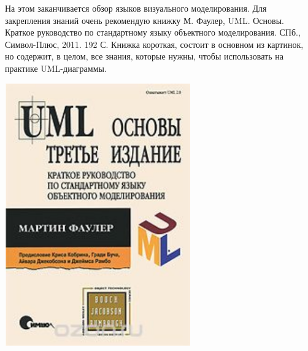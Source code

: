 \documentclass[a5paper]{article}
\newlength\Colsep
\begin{document}
\noindent\begin{minipage}{\textwidth}
	\begin{minipage}[c][6cm][c]{\dimexpr0.7\textwidth-0.5\Colsep\relax}
		На этом заканчивается обзор языков визуального моделирования. Для закрепления знаний очень рекомендую книжку М. Фаулер, UML. Основы. Краткое руководство по стандартному языку объектного моделирования. СПб., Символ-Плюс, 2011. 192 С. Книжка короткая, состоит в основном из картинок, но содержит, в целом, все знания, которые нужны, чтобы использовать на практике UML-диаграммы.
	\end{minipage}\hfill
	\begin{minipage}[c][6cm][c]{\dimexpr0.3\textwidth-0.5\Colsep\relax}
		\includegraphics[width=0.6\textwidth]{umlBookCover.png}
	\end{minipage}%
\end{minipage}
\end{document}

